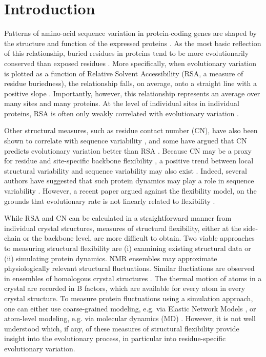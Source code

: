 \documentclass[smallextended]{svjour3}
\begin{document}
\section*{Introduction}

Patterns of amino-acid sequence variation in protein-coding genes are shaped by the structure and function of the expressed proteins
\citep{WilkeDrummond2010,Liberlesetal2012,MarshTeichmann2014}. As the most basic reflection of this relationship, buried residues in proteins tend to be more evolutionarily conserved than exposed residues
\citep{Overingtonetal1992,Goldmanetal1998,MirnyShakhnovich1999,Deanetal2002}. More specifically, when evolutionary variation is plotted as a function of Relative Solvent Accessibility (RSA, a measure of residue buriedness), the relationship falls, on average, onto a straight line with a positive slope \citep{FranzosaXia2009,Ramseyetal2011,FranzosaXia2012,Scherreretal2012}. Importantly, however, this relationship represents an average over many sites and many proteins. At the level of individual sites in individual proteins, RSA is often only weakly correlated with evolutionary variation \citep{MeyerWilke2013,Meyeretal2013,Yehetal2014}.

Other structural measures, such as residue contact number (CN), have also been shown to correlate with sequence variability \citep{Liaoetal2005,FranzosaXia2009,Yehetal2014}, and some have argued that CN predicts evolutionary variation better than RSA \citep{Yehetal2014,Yehetal2014b}. Because CN may be a proxy for residue and site-specific backbone flexibility \citep{Halle2002}, a positive trend between local structural variability and sequence variability may also exist \citep{Yehetal2014}. Indeed, several authors have suggested that such protein dynamics may play a role in sequence variability \citep{LiuBahar2012,NevinGereketal2013,MarshTeichmann2014}. However, a recent paper argued against the flexibility model, on the grounds that evolutionary rate is not linearly related to flexibility \citep{Huangetal2014}.

While RSA and CN can be calculated in a straightforward manner from individual crystal structures, measures of structural flexibility, either at the side-chain or the backbone level, are more difficult to obtain. Two viable approaches to measuring structural flexibility are (i) examining existing structural data or (ii) simulating protein dynamics. NMR ensembles may approximate physiologically relevant structural fluctuations. Similar fluctiations are observed in ensembles of homologous crystal structures \citep{Maguidaetal2008,EchaveFernandez2010}. The thermal motion of atoms in a crystal are recorded in B factors, which are available for every atom in every crystal structure. To measure protein fluctuations using a simulation approach, one can either use coarse-grained modeling, e.g. via Elastic Network Models \citep{Sanejouand2013}, or atom-level modeling, e.g. via molecular dynamics (MD) \citep{KarplusMcCammon2002}. However, it is not well understood which, if any, of these measures of structural flexibility provide insight into the evolutionary process, in particular into residue-specific evolutionary variation.
\end{document}
